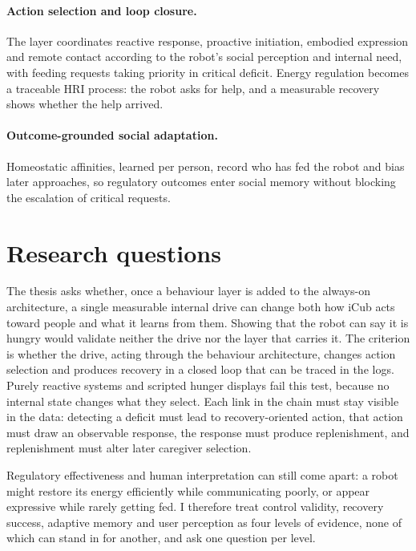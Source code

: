 \paragraph{Action selection and loop closure.}
The layer coordinates reactive response, proactive initiation, embodied expression and remote contact according to the robot's social perception and internal need, with feeding requests taking priority in critical deficit. Energy regulation becomes a traceable HRI process: the robot asks for help, and a measurable recovery shows whether the help arrived.

\paragraph{Outcome-grounded social adaptation.}
Homeostatic affinities, learned per person, record who has fed the robot and bias later approaches, so regulatory outcomes enter social memory without blocking the escalation of critical requests.

\section{Research questions}
\label{sec:intro-research-questions}

The thesis asks whether, once a behaviour layer is added to the always-on architecture, a single measurable internal drive can change both how iCub acts toward people and what it learns from them. Showing that the robot can say it is hungry would validate neither the drive nor the layer that carries it. The criterion is whether the drive, acting through the behaviour architecture, changes action selection and produces recovery in a closed loop that can be traced in the logs. Purely reactive systems and scripted hunger displays fail this test, because no internal state changes what they select. Each link in the chain must stay visible in the data: detecting a deficit must lead to recovery-oriented action, that action must draw an observable response, the response must produce replenishment, and replenishment must alter later caregiver selection.

Regulatory effectiveness and human interpretation can still come apart: a robot might restore its energy efficiently while communicating poorly, or appear expressive while rarely getting fed. I therefore treat control validity, recovery success, adaptive memory and user perception as four levels of evidence, none of which can stand in for another, and ask one question per level.

